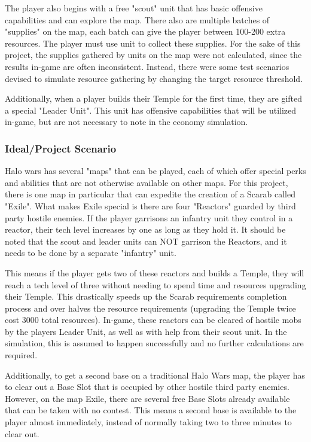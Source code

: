 \documentclass[a4paper, 12pt, english]{article}
\begin{document}
The player also begins with a free "scout" unit that has basic offensive capabilities and can explore the map. There also are multiple batches of "supplies" on the map, each batch can give the player between 100-200 extra resources. The player must use unit to collect these supplies. For the sake of this project, the supplies gathered by units on the map were not calculated, since the results in-game are often inconsistent. Instead, there were some test scenarios devised to simulate resource gathering by changing the target resource threshold.
\newline

Additionally, when a player builds their Temple for the first time, they are gifted a special "Leader Unit". This unit has offensive capabilities that will be utilized in-game, but are not necessary to note in the economy simulation.

\subsubsection{Ideal/Project Scenario}
Halo wars has several "maps" that can be played, each of which offer special perks and abilities that are not otherwise available on other maps. For this project, there is one map in particular that can expedite the creation of a Scarab called "Exile". What makes Exile special is there are four "Reactors" guarded by third party hostile enemies. If the player garrisons an infantry unit they control in a reactor, their tech level increases by one as long as they hold it. It should be noted that the scout and leader units can NOT garrison the Reactors, and it needs to be done by a separate "infantry" unit.
\newline

This means if the player gets two of these reactors and builds a Temple, they will reach a tech level of three without needing to spend time and resources upgrading their Temple. This drastically speeds up the Scarab requirements completion process and over halves the resource requirements (upgrading the Temple twice cost 3000 total resources). In-game, these reactors can be cleared of hostile mobs by the players Leader Unit, as well as with help from their scout unit. In the simulation, this is assumed to happen successfully and no further calculations are required.
\newline

Additionally, to get a second base on a traditional Halo Wars map, the player has to clear out a Base Slot that is occupied by other hostile third party enemies. However, on the map Exile, there are several free Base Slots already available that can be taken with no contest. This means a second base is available to the player almost immediately, instead of normally taking two to three minutes to clear out.
\newline
\end{document}
